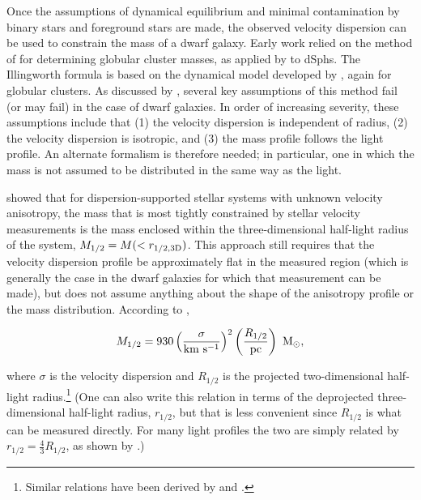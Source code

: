 \documentclass[a4paper]{ar-1col}
\begin{document}
Once the assumptions of dynamical equilibrium and minimal
contamination by binary stars and foreground stars are made, the
observed velocity dispersion can be used to constrain the mass of a
dwarf galaxy.  Early work
\citep[e.g.,][]{kleyna05,munoz06,martin07,sg07} relied on the method
of \citet{illingworth76} for determining globular cluster masses, as
applied by \citet{mateo98} to dSphs.  The Illingworth formula is based
on the dynamical model developed by \citet{king66}, again for globular
clusters.  As discussed by \citet{wolf10}, several key assumptions of
this method fail (or may fail) in the case of dwarf galaxies.  In
order of increasing severity, these assumptions include that (1) the
velocity dispersion is independent of radius, (2) the velocity
dispersion is isotropic, and (3) the mass profile follows the light
profile.  An alternate formalism is therefore needed; in particular,
one in which the mass is not assumed to be distributed in the same way
as the light.

\citet{wolf10} showed that for dispersion-supported stellar systems
with unknown velocity anisotropy, the mass that is most tightly
constrained by stellar velocity measurements is the mass enclosed
within the three-dimensional half-light radius of the system, $M_{1/2}
= M(<r_{1/2,3{\rm D}})$.  This approach still requires that the
velocity dispersion profile be approximately flat in the measured
region (which is generally the case in the dwarf galaxies for which
that measurement can be made), but does not assume anything about the
shape of the anisotropy profile or the mass distribution.  According
to \citet{wolf10},

\begin{equation}
M_{1/2} = 930 \left( \frac{\sigma}{{\rm km}~{\rm
    s}^{-1}}\right)^{2} \left(\frac{R_{1/2}}{\rm pc}\right)~{\rm M}_{\odot},
\label{eq:mhalf}
\end{equation}

\noindent
where $\sigma$ is the velocity dispersion and $R_{1/2}$ is the
projected two-dimensional half-light radius.\footnote{Similar
  relations have been derived by \citet{walker09} and
  \citet{errani18}.}  (One can also write this relation in terms of
the deprojected three-dimensional half-light radius, $r_{1/2}$, but
that is less convenient since $R_{1/2}$ is what can be measured
directly.  For many light profiles the two are simply related by
$r_{1/2} = \frac{4}{3}R_{1/2}$, as shown by \citealt{wolf10}.)
\end{document}

